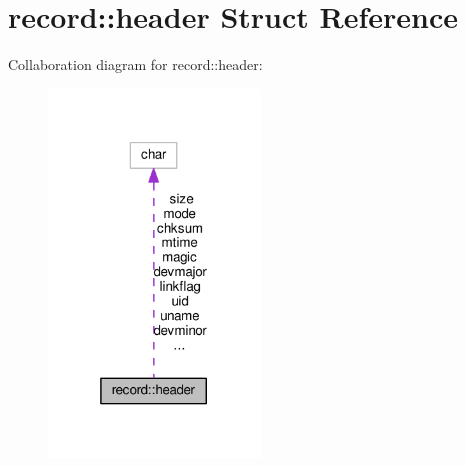 \hypertarget{structrecord_1_1header}{}\section{record\+:\+:header Struct Reference}
\label{structrecord_1_1header}


Collaboration diagram for record\+:\+:header\+:
\nopagebreak
\begin{figure}[H]
\begin{center}
\leavevmode
\includegraphics[width=160pt]{structrecord_1_1header__coll__graph}
\end{center}
\end{figure}
